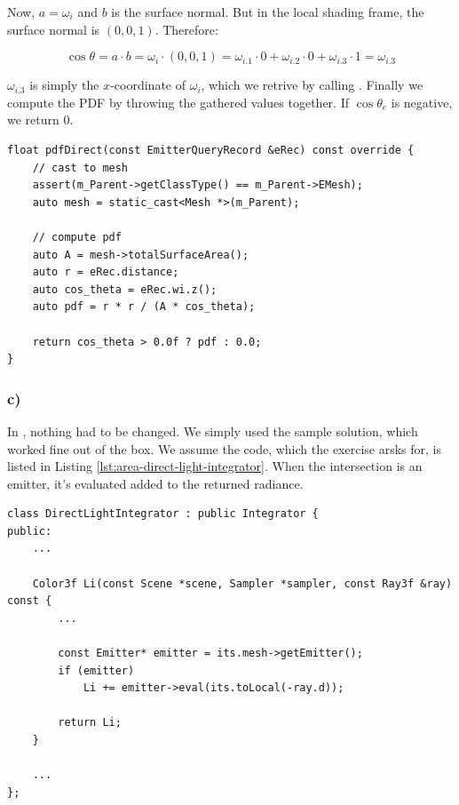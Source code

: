 Now, $a=\omega_i$ and $b$ is the surface normal. But in the local shading frame, the surface normal is $(0, 0, 1)$. Therefore:

\[
    \cos\theta = a\cdot b = \omega_i\cdot (0, 0, 1) = \omega_{i.1} \cdot 0 + \omega_{i.2} \cdot 0 + \omega_{i.3} \cdot 1 = \omega_{i.3}
\]

$\omega_{i.3}$ is simply the $x$-coordinate of $\omega_i$, which we retrive by calling . Finally we compute the PDF by throwing the gathered values together. If $\cos\theta_e$ is negative, we return 0.

\begin{lstlisting}[caption={\code{AreaLight::pdfDirect}},label={lst:area-pdf-direct}]
float pdfDirect(const EmitterQueryRecord &eRec) const override {
    // cast to mesh
    assert(m_Parent->getClassType() == m_Parent->EMesh);
    auto mesh = static_cast<Mesh *>(m_Parent);
    
    // compute pdf
    auto A = mesh->totalSurfaceArea();
    auto r = eRec.distance;
    auto cos_theta = eRec.wi.z();
    auto pdf = r * r / (A * cos_theta);
    
    return cos_theta > 0.0f ? pdf : 0.0;
}
\end{lstlisting}

\subsubsection*{c)}

In , nothing had to be changed. We simply used the sample solution, which worked fine out of the box. We assume the code, which the exercise arsks for, is listed in Listing \ref{lst:area-direct-light-integrator}. When the intersection  is an emitter, it's evaluated added to the returned radiance.

\begin{lstlisting}[caption={\code{DirectLightIntegrator}},label={lst:area-direct-light-integrator}]
class DirectLightIntegrator : public Integrator {
public:
    ...
    
    Color3f Li(const Scene *scene, Sampler *sampler, const Ray3f &ray) const {
        ...

        const Emitter* emitter = its.mesh->getEmitter();
        if (emitter)
            Li += emitter->eval(its.toLocal(-ray.d));

        return Li;
    }
    
    ...
};
\end{lstlisting}

